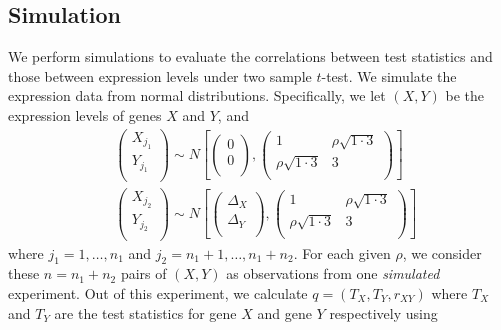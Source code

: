 \documentclass[12pt, a4paper]{article}
\begin{document}
	
	
	\subsection{Simulation}
	We perform simulations to evaluate the correlations between test statistics and those between expression levels under two sample $t$-test. We simulate the expression data from normal distributions. Specifically, we let $(X, Y)$ be the expression levels of genes $X$ and $Y$, and
	\begin{equation}
		\begin{aligned}
			&\left( \begin{array}{c}
				X_{j_1}\\
				Y_{j_1}\\
			\end{array}\right)
			\sim N\left[
			\left(\begin{array}{c}
				0\\
				0\\
			\end{array} \right), 
			\left(
			\begin{array}{cc}
				1 &\rho \sqrt{1\cdot 3} \\
				\rho \sqrt{1\cdot 3} & 	3 \\
			\end{array}
			\right)
			\right] \\
			& \left( \begin{array}{c}
				X_{j_2}\\
				Y_{j_2}\\
			\end{array}\right)
			\sim N\left[
			\left(\begin{array}{c}
				\Delta_X\\
				 \Delta_Y\\
			\end{array} \right), 
			\left(
			\begin{array}{cc}
				1 &\rho \sqrt{1\cdot 3} \\
				\rho \sqrt{1\cdot 3} & 	3 \\
			\end{array}
			\right)
			\right] 
		\end{aligned}
	\end{equation}
	where $j_1 = 1,\ldots, n_1$ and $j_2 = n_1 + 1, \ldots, n_1 + n_2$. For each given $\rho$, we 
	consider these $n=n_1 + n_2$ pairs of $(X, Y)$
	as observations from one \textit{simulated} experiment. Out of this experiment, we calculate $q = (T_X, T_Y, r_{XY})$ where $T_X$ and $T_Y$ are the test statistics for gene $X$ and gene $Y$ respectively using 
\end{document}
